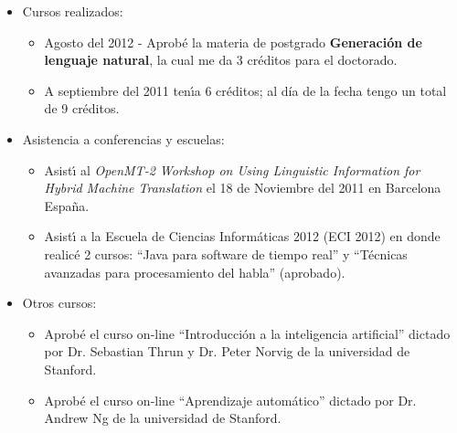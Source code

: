 \begin{itemize}
\item Cursos realizados:
\begin{itemize}
\item Agosto del 2012 - Aprob\'e la materia de postgrado {\bf Generaci\'on de lenguaje natural}, la cual me da 3 cr\'editos para el doctorado.
\item A septiembre del 2011 ten\'{\i}a 6 cr\'editos; al d\'ia de la fecha tengo un total de 9 cr\'editos.
\end{itemize}
\item Asistencia a conferencias y escuelas:
\begin{itemize}
\item Asist\'{\i} al \emph{OpenMT-2 Workshop on Using Linguistic Information for Hybrid Machine Translation} el 18 de Noviembre del 2011 en  Barcelona Espa\~na.
\item Asist\'{\i} a la Escuela de Ciencias Inform\'aticas 2012 (ECI 2012) en donde realic\'e 2 cursos: ``Java para software de tiempo real'' 
y ``T\'ecnicas avanzadas para procesamiento del habla'' (aprobado).
\end{itemize}
\item Otros cursos:
\begin{itemize}
\item Aprob\'e el curso on-line ``Introducci\'on a la inteligencia artificial'' dictado por Dr. Sebastian Thrun y Dr. Peter Norvig de la 
universidad de Stanford.
\item Aprob\'e el curso on-line ``Aprendizaje autom\'atico'' dictado por Dr. Andrew Ng de la universidad de Stanford. 
\end{itemize}

\end{itemize}




